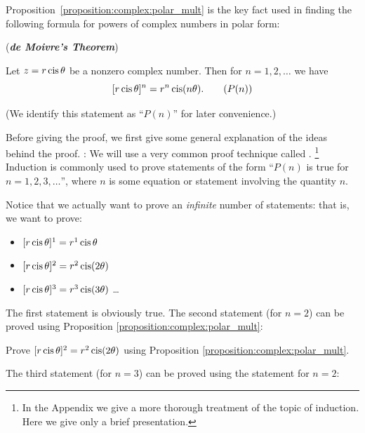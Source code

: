 {\begin{exercise}
\begin{multicols}{2}
\begin{enumerate}[(a)]
\end{enumerate}
\end{multicols}
\end{exercise}

\noindent
Proposition~\ref{proposition:complex:polar_mult} is the key fact used in finding the following formula for powers of complex numbers in polar form:

\begin{prop}\label{proposition:complex:DeMoivre} (\textbf{\emph{de Moivre's Theorem}})

Let $z=r\operatorname{cis}\theta$ be a nonzero complex number. Then for $n=1,2,\ldots$ we have
\[ [r\operatorname{cis}\theta]^{n}=r^{n}\operatorname{cis}(n\theta).\tag{$P(n)$}\]
 \end{prop}
(We identify this statement as ``$P(n)$'' for later convenience.)

 Before giving the proof, we first give some general explanation of the ideas behind the proof.
\bigskip
\newline
{}:  We will use a very common proof technique called .
\footnote{In the Appendix we give a more thorough treatment of the topic of induction. Here we give only a brief presentation.}
 Induction is commonly used to prove statements of the form ``$P(n)$ is true for $n = 1,2,3,\ldots$'', where $n$ is some equation or statement involving the quantity $n$. 

Notice that we actually want to prove an \emph{infinite} number of statements: that is, we want to prove:
\begin{itemize}
\item 
$[r\operatorname{cis}\theta]^{1}=r^{1}\operatorname{cis}\theta$
\item
$[r\operatorname{cis}\theta]^{2}=r^{2}\operatorname{cis}(2\theta)$
\item
$[r\operatorname{cis}\theta]^{3}=r^{3}\operatorname{cis}(3\theta)$
\ldots
\end{itemize}

\noindent The first statement is obviously true. The second statement (for $n=2$) can be proved using Proposition
\ref{proposition:complex:polar_mult}:

\begin{exercise}\label{exercise:complex:27} Prove $[r\operatorname{cis}\theta]^{2}=r^{2}\operatorname{cis}(2\theta)$ using Proposition
\ref{proposition:complex:polar_mult}.
\end{exercise}

The third statement (for $n=3$) can be proved using the statement for $n=2$:

}
